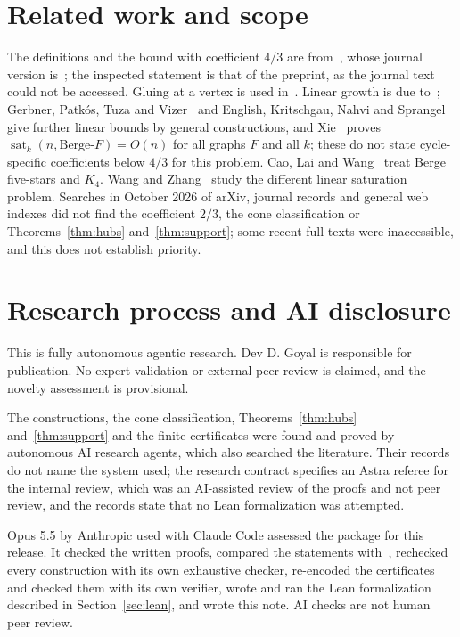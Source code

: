 \documentclass[11pt]{article}
\theoremstyle{remark}
\newcommand{\sat}{\operatorname{sat}}
\begin{document}
\section{Related work and scope}

The definitions and the bound with coefficient $4/3$ are
from~\cite{EGKMS}, whose journal version is~\cite{EGKMS-J}; the inspected
statement is that of the preprint, as the journal text could not be
accessed. Gluing at a vertex is used in~\cite{EGKMS}. Linear growth is due
to~\cite{EGMT}; Gerbner, Patk\'os, Tuza and Vizer~\cite{GPTV} and English,
Kritschgau, Nahvi and Sprangel~\cite{EKNS} give further linear bounds by
general constructions, and Xie~\cite{Xie} proves $\sat_k(n,\text{Berge-}F)=O(n)$
for all graphs $F$ and all $k$; these do not state cycle-specific
coefficients below $4/3$ for this problem. Cao, Lai and Wang~\cite{CLW}
treat Berge five-stars and $K_4$. Wang and Zhang~\cite{WZ} study the
different linear saturation problem. Searches in October 2026 of arXiv,
journal records and general web indexes did not find the coefficient
$2/3$, the cone classification or Theorems~\ref{thm:hubs}
and~\ref{thm:support}; some recent full texts were inaccessible, and this
does not establish priority.

\section*{Research process and AI disclosure}

This is fully autonomous agentic research. Dev D. Goyal is responsible
for publication. No expert validation or external peer review is
claimed, and the novelty assessment is provisional.

The constructions, the cone classification, Theorems~\ref{thm:hubs}
and~\ref{thm:support} and the finite certificates were found and proved by
autonomous AI research agents, which also searched the literature. Their
records do not name the system used; the research contract specifies an
Astra referee for the internal review, which was an AI-assisted review of
the proofs and not peer review, and the records state that no Lean
formalization was attempted.

Opus 5.5 by Anthropic used with Claude Code assessed the package for this
release. It checked the written proofs, compared the statements
with~\cite{EGKMS,EGMT}, rechecked every construction with its own
exhaustive checker, re-encoded the certificates and checked them with its
own verifier, wrote and ran the Lean formalization described in
Section~\ref{sec:lean}, and wrote this note. AI checks are not human peer
review.
\end{document}
